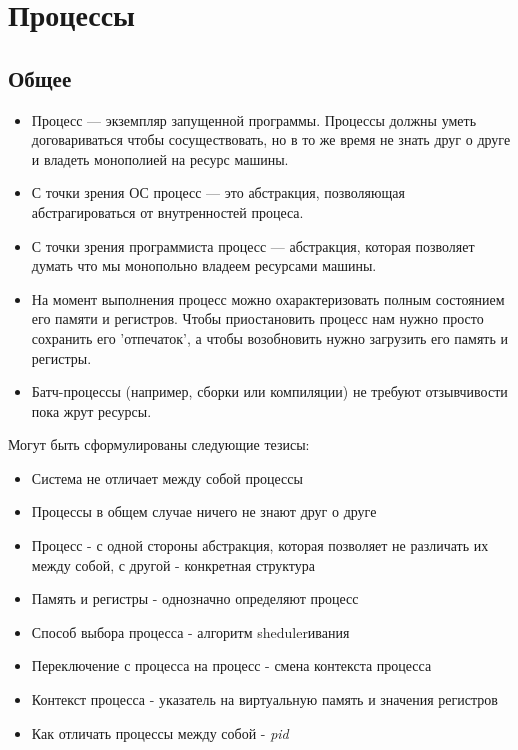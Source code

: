 \documentclass[../../lectures.tex]{subfiles}
\begin{document}
\chapter{Процессы}

\section{Общее}
\begin{itemize}
    \item Процесс --- экземпляр запущенной программы. Процессы должны уметь договариваться
          чтобы сосуществовать, но в то же время не знать друг о друге и владеть
          монополией на ресурс машины.
    \item С точки зрения ОС процесс --- это абстракция, позволяющая 
          абстрагироваться от внутренностей процеса.
    \item С точки зрения программиста процесс --- абстракция, 
          которая позволяет думать что мы монопольно владеем ресурсами машины.
    \item На момент выполнения процесс можно охарактеризовать полным состоянием его памяти
          и регистров. Чтобы приостановить процесс нам нужно просто сохранить его 'отпечаток', 
          а чтобы возобновить нужно загрузить его память и регистры.
    \item Батч-процессы (например, сборки или компиляции) не требуют 
          отзывчивости пока жрут ресурсы.
\end{itemize}

Могут быть сформулированы следующие тезисы:
\begin{itemize}
    \item Система не отличает между собой процессы
    \item Процессы в общем случае ничего не знают друг о друге
    \item Процесс - с одной стороны абстракция, которая позволяет не различать их 
          между собой, с другой - конкретная структура
    \item Память и регистры - однозначно определяют процесс
    \item Способ выбора процесса - алгоритм shedulerивания
    \item Переключение с процесса на процесс - смена контекста процесса
    \item Контекст процесса - указатель на виртуальную память и значения регистров
    \item Как отличать процессы между собой - \emph{pid}
\end{itemize}
\end{document}
